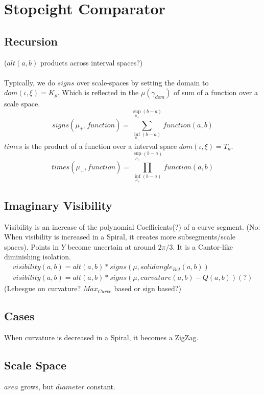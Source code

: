 \documentclass{report}
\begin{document}
\section{Stopeight Comparator}

\subsection{Recursion}
($alt(a,b)$ products across interval spaces?)\\\\
Typically, we do $signs$ over scale-spaces by setting the domain to $dom(\iota,\xi)=K_{p}$.
Which is reflected in the $\mu(\gamma_{dom})$ of sum of a function over a scale space.\\
\begin{equation}
signs(\mu_{+},function )= \sum \limits _{\inf \limits _{\mu_{+}} (b-a)}^{\sup \limits _{\mu_{+}} (b-a)} function (a,b)
\end{equation}
$times$ is the product of a function over a interval space $dom(\iota,\xi)=T_{n}$.
\begin{equation}
times(\mu_{+},function) = \prod_{\inf \limits _{\mu_{+}} (b-a)}^{\sup \limits _{\mu_{+}} (b-a)} function(a,b)
\end{equation}

\subsection{Imaginary Visibility}
Visibility is an increase of the polynomial Coefficients(?) of a curve segment.
(No: When visibility is increased in a Spiral, it creates more subsegments/scale spaces). Points in $Y$ become uncertain at around $2\pi/3$. It is a Cantor-like diminishing isolation.
\begin{align}
visibility(a,b)= alt(a,b) * signs(\mu,solidangle_{Rel}(a,b))\\
visibility(a,b)= alt(a,b) * signs(\mu,curvature(a,b)-Q(a,b))(?)
\end{align}
(Lebesgue on curvature? $Max_{Curve}$ based or sign based?)
\subsection*{Cases}
When curvature is decreased in a Spiral, it becomes a ZigZag.
\subsection*{Scale Space}
$area$ grows, but $diameter$ constant.
\end{document}
